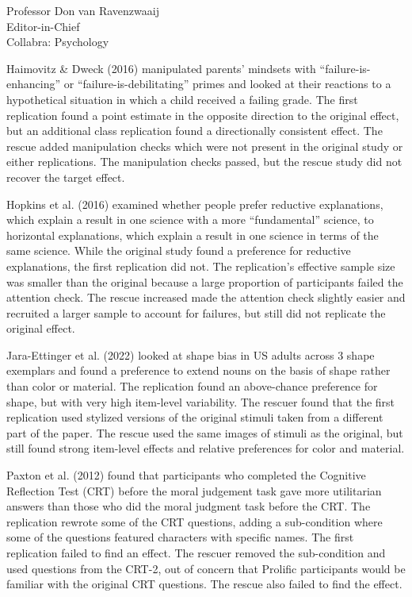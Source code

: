 \documentclass{stanfordletter}
\begin{document}
\begin{letter}{Professor Don van Ravenzwaaij \\ Editor-in-Chief \\ Collabra: Psychology }
{		 	Haimovitz \& Dweck (2016) manipulated parents' mindsets with ``failure-is-enhancing'' or ``failure-is-debilitating'' primes and looked at their reactions to a hypothetical situation in which a child received a failing grade.
		 	The first replication found a point estimate in the opposite direction to the original effect, but an additional class replication found a directionally consistent effect.
		 	The rescue added manipulation checks which were not present in the original study or either replications.
		 	The manipulation checks passed, but the rescue study did not recover the target effect.
		 	\newline
		 	
		 	Hopkins et al. (2016) examined whether people prefer reductive explanations, which explain a result in one science with a more ``fundamental'' science, to horizontal explanations, which explain a result in one science in terms of the same science.
		 	While the original study found a preference for reductive explanations, the first replication did not.
		 	The replication's effective sample size was smaller than the original because a large proportion of participants failed the attention check.
		 	The rescue increased made the attention check slightly easier and recruited a larger sample to account for failures, but still did not replicate the original effect.
		 	\newline
		 	
		 	Jara-Ettinger et al. (2022) looked at shape bias in US adults across 3 shape exemplars and found a preference to extend nouns on the basis of shape rather than color or material.
		 	The replication found an above-chance preference for shape, but with very high item-level variability.
		 	The rescuer found that the first replication used stylized versions of the original stimuli taken from a different part of the paper.
		 	The rescue used the same images of stimuli as the original, but still found strong item-level effects and relative preferences for color and material.
		 	\newline
		 	
		 	Paxton et al. (2012) found that participants who completed the Cognitive Reflection Test (CRT) before the moral judgement task gave more utilitarian answers than those who did the moral judgment task before the CRT.
		 	The replication rewrote some of the CRT questions, adding a sub-condition where some of the questions featured characters with specific names.
		 	The first replication failed to find an effect.
		 	The rescuer removed the sub-condition and used questions from the CRT-2, out of concern that Prolific participants would be familiar with the original CRT questions.
		 	The rescue also failed to find the effect.
		 	\newline
		 	
}
\end{letter}
\end{document}
